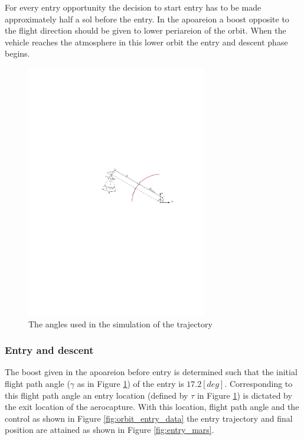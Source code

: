 For every entry opportunity the decision to start entry has to be made approximately half a sol before the entry. In the apoareion a boost opposite to the flight direction should be given to lower periareion of the orbit.  When the vehicle reaches the atmosphere in this lower orbit the entry and descent phase begins.

\begin{figure}[h]
	\centering
	\includegraphics[width=0.7\textwidth]{Figure/Orbit/angles.pdf}
	\caption{The angles used in the simulation of the trajectory}
	\label{fig:angles}
\end{figure}

\subsubsection{Entry and descent}\label{sec:entry_descent}
The boost given in the apoareion before entry is determined such that the initial flight path angle ($\gamma$ as in Figure \ref{fig:angles}) of the entry is $17.2 \left[deg\right]$. Corresponding to this flight path angle an entry location (defined by $\tau$ in Figure \ref{fig:angles}) is dictated by the exit location of the aerocapture. With this location, flight path angle and the control as shown in Figure \ref{fig:orbit_entry_data} the entry trajectory and final position are attained as shown in Figure \ref{fig:entry_mars}.

